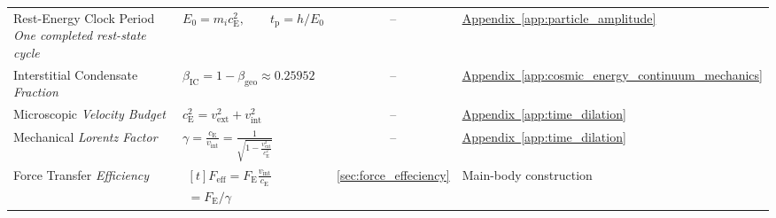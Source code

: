 \begin{longtable}{@{} p{4.5cm} p{6cm} c p{4cm} @{}}
{\raggedright Rest-Energy Clock Period \newline \textit{One completed rest-state cycle}\par} & {\raggedright $E_0=m_i c_{\mathrm E}^2,\qquad t_{\mathrm p}=h/E_0$\par} & -- & {\raggedright \hyperref[app:particle_amplitude]{Appendix~\ref*{app:particle_amplitude}}\par} \\

{\raggedright Interstitial Condensate \newline \textit{Fraction}\par} & {\raggedright $\beta_{\mathrm{IC}} = 1 - \beta_{\mathrm{geo}} \approx 0.25952$\par} & -- & {\raggedright \hyperref[app:cosmic_energy_continuum_mechanics]{Appendix~\ref*{app:cosmic_energy_continuum_mechanics}}\par} \\

{\raggedright Microscopic \newline \textit{Velocity Budget}\par} & {\raggedright $c_{\mathrm{E}}^2 = v_{\mathrm{ext}}^2 + v_{\mathrm{int}}^2$\par} & -- & {\raggedright \hyperref[app:time_dilation]{Appendix~\ref*{app:time_dilation}}\par} \\

{\raggedright Mechanical \newline \textit{Lorentz Factor}\par} & {\raggedright $\gamma = \frac{c_{\mathrm{E}}}{v_{\mathrm{int}}} = \frac{1}{\sqrt{1 - \frac{v_{\mathrm{ext}}^2}{c_{\mathrm{E}}^2}}}$\par} & -- & {\raggedright \hyperref[app:time_dilation]{Appendix~\ref*{app:time_dilation}}\par} \\

{\raggedright Force Transfer \newline \textit{Efficiency}\par} & {\raggedright $\begin{gathered}[t]F_{\mathrm{eff}}=F_{\mathrm E}\frac{v_{\mathrm{int}}}{c_{\mathrm E}} \\ =F_{\mathrm E}/\gamma\end{gathered}$\par} & \hyperref[sec:force_effeciency]{\ref*{sec:force_effeciency}} & {\raggedright Main-body construction\par} \\


\end{longtable}
